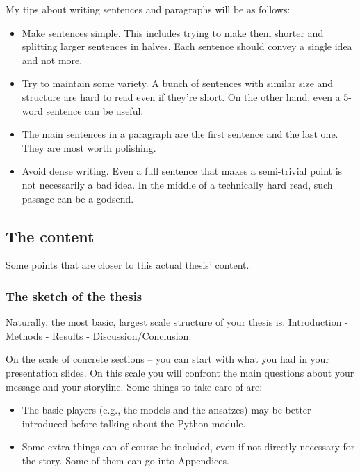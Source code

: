 \documentclass[10pt, a4paper]{article}
\begin{document}
My tips about writing sentences and paragraphs will be as follows:

\begin{itemize}
	\item Make sentences simple. This includes trying to make them shorter and splitting larger sentences in halves. Each sentence should convey a single idea and not more.
	\item Try to maintain some variety. A bunch of sentences with similar size and structure are hard to read even if they're short. On the other hand, even a 5-word sentence can be useful.
	\item The main sentences in a paragraph are the first sentence and the last one. They are most worth polishing.
	\item Avoid dense writing. Even a full sentence that makes a semi-trivial point is not necessarily a bad idea. In the middle of a technically hard read, such passage can be a godsend. 
\end{itemize}

\subsection*{The content}

Some points that are closer to this actual thesis' content.

\subsubsection*{The sketch of the thesis}

Naturally, the most basic, largest scale structure of your thesis is: Introduction - Methods - Results - Discussion/Conclusion.

On the scale of concrete sections -- you can start with what you had in your presentation slides. On this scale you will confront the main questions about your message and your storyline. Some things to take care of are:
\begin{itemize}
\item The basic players (e.g., the models and the ansatzes) may be better introduced before talking about the Python module.
\item Some extra things can of course be included, even if not directly necessary for the story. Some of them can go into Appendices.
\end{itemize}
\end{document}
